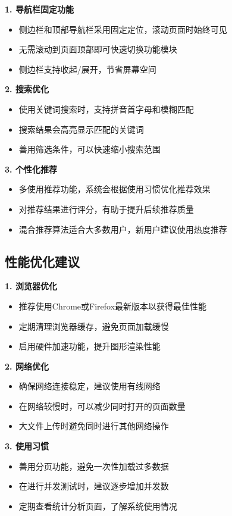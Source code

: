 \documentclass[12pt, a4paper]{article}
\begin{document}
\begin{successbox}[title={提升使用效率的技巧}]
\textbf{1. 导航栏固定功能}
\begin{itemize}[nosep]
    \item 侧边栏和顶部导航栏采用固定定位，滚动页面时始终可见
    \item 无需滚动到页面顶部即可快速切换功能模块
    \item 侧边栏支持收起/展开，节省屏幕空间
\end{itemize}

\textbf{2. 搜索优化}
\begin{itemize}[nosep]
    \item 使用关键词搜索时，支持拼音首字母和模糊匹配
    \item 搜索结果会高亮显示匹配的关键词
    \item 善用筛选条件，可以快速缩小搜索范围
\end{itemize}

\textbf{3. 个性化推荐}
\begin{itemize}[nosep]
    \item 多使用推荐功能，系统会根据使用习惯优化推荐效果
    \item 对推荐结果进行评分，有助于提升后续推荐质量
    \item 混合推荐算法适合大多数用户，新用户建议使用热度推荐
\end{itemize}
\end{successbox}

\subsection{性能优化建议}

\begin{warningbox}[title={系统性能优化}]
\textbf{1. 浏览器优化}
\begin{itemize}[nosep]
    \item 推荐使用Chrome或Firefox最新版本以获得最佳性能
    \item 定期清理浏览器缓存，避免页面加载缓慢
    \item 启用硬件加速功能，提升图形渲染性能
\end{itemize}

\textbf{2. 网络优化}
\begin{itemize}[nosep]
    \item 确保网络连接稳定，建议使用有线网络
    \item 在网络较慢时，可以减少同时打开的页面数量
    \item 大文件上传时避免同时进行其他网络操作
\end{itemize}

\textbf{3. 使用习惯}
\begin{itemize}[nosep]
    \item 善用分页功能，避免一次性加载过多数据
    \item 在进行并发测试时，建议逐步增加并发数
    \item 定期查看统计分析页面，了解系统使用情况
\end{itemize}
\end{warningbox}
\end{document}
